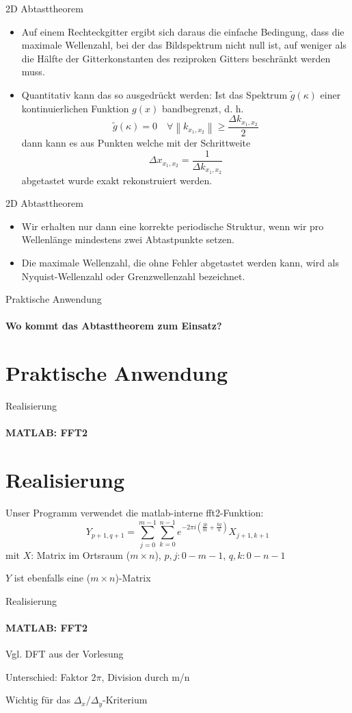 \documentclass{beamer}
\begin{document}
	\begin{frame}{2D Abtasttheorem}
	\begin{itemize}
		\item Auf einem Rechteckgitter ergibt sich daraus die einfache Bedingung,	dass die maximale Wellenzahl, bei der das Bildspektrum nicht null ist,
		auf weniger als die Hälfte der Gitterkonstanten des reziproken Gitters beschränkt werden muss.
		\item Quantitativ kann das so ausgedrückt werden: Ist das Spektrum $\tilde{g}(\kappa)$ einer kontinuierlichen Funktion $g(x)$ bandbegrenzt, d. h.
		$$\tilde{g}(\kappa) = 0 \hspace{1em} \forall \left\|k_{x_1,x_2}\right\|\ge \frac{\Delta k_{x_1,x_2}}{2} $$
		dann kann es aus Punkten welche mit der Schrittweite
		$$\Delta x_{x_1,x_2} = \frac{1}{\Delta k_{x_1,x_2}} $$
		abgetastet wurde exakt rekonstruiert werden.\cite{bildverarbeitung}
	\end{itemize}
	\end{frame}

	\begin{frame}{2D Abtasttheorem}
	\begin{itemize}
		\item Wir erhalten nur dann eine korrekte periodische
		Struktur, wenn wir pro Wellenlänge mindestens zwei Abtastpunkte setzen.
		\item Die maximale Wellenzahl, die ohne Fehler abgetastet werden kann, wird als	Nyquist-Wellenzahl oder Grenzwellenzahl bezeichnet.
	\end{itemize}
\end{frame}

	\begin{frame}{Praktische Anwendung}
	\framesubtitle{Wo kommt das Abtasttheorem zum Einsatz?}
	\section{Praktische Anwendung}
	\end{frame}
	
	\begin{frame}{Realisierung}
	\framesubtitle{MATLAB: FFT2}
	\section{Realisierung}	
	Unser Programm verwendet die matlab-interne fft2-Funktion:
	$$Y_{p+1,q+1} = \sum_{j=0}^{m-1}\sum_{k=0}^{n-1}e^{-2\pi i(\frac{jp}{m}+\frac{kq}{n})}X_{j+1,k+1}$$ mit $X$: Matrix im Ortsraum ($m\times n$), $p,j: 0 - m-1$, $q,k: 0 - n-1$

	$Y$ ist ebenfalls eine ($m\times n$)-Matrix
	\end{frame}
	\begin{frame}{Realisierung}
	\framesubtitle{MATLAB: FFT2}
	Vgl. DFT aus der Vorlesung
	
	Unterschied: Faktor $2\pi$, Division durch m/n
	
	Wichtig für das $\Delta_x / \Delta_y$-Kriterium
	\end{frame}
	
\end{document}
